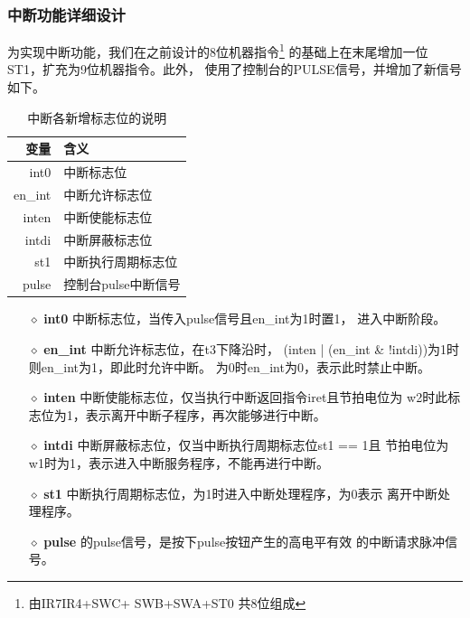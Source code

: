 \subsubsection{中断功能详细设计}
为实现中断功能，我们在之前设计的8位机器指令\footnote{ 由IR7\wave IR4+SWC+
    SWB+SWA+ST0 共8位组成} 的基础上在末尾增加一位ST1，扩充为9位机器指令。此外，
使用了控制台的PULSE信号，并增加了新信号如下。
\begin{table}[h]
    \centering
    \label{interrupt_signal}
    \begin{tabular}[c]{r | l }
        \hline
        变量      & 含义           \\
        \hline
        int0    & 中断标志位        \\
        en\_int & 中断允许标志位      \\ %
        inten   & 中断使能标志位      \\
        intdi   & 中断屏蔽标志位      \\
        st1     & 中断执行周期标志位    \\
        pulse   & 控制台pulse中断信号 \\
        \hline
    \end{tabular}
    \caption{中断各新增标志位的说明}
\end{table}
\begin{itemize}
    \item[$\diamond$ \textbf{int0}] 中断标志位，当传入pulse信号且en\_{}int为1时置1，
        进入中断阶段。
    \item[$\diamond$ \textbf{en\_int}] 中断允许标志位，在t3下降沿时，
        (inten | (en\_int \& !intdi))为1时则en\_int为1，即此时允许中断。
        为0时en\_int为0，表示此时禁止中断。
    \item[$\diamond$ \textbf{inten}] 中断使能标志位，仅当执行中断返回指令iret且节拍电位为
        w2时此标志位为1，表示离开中断子程序，\tec 再次能够进行中断。
    \item[$\diamond$ \textbf{intdi}] 中断屏蔽标志位，仅当中断执行周期标志位st1 == 1且
        节拍电位为w1时为1，表示进入中断服务程序，\tec 不能再进行中断。
    \item[$\diamond$ \textbf{st1}] 中断执行周期标志位，为1时进入中断处理程序，为0表示
        离开中断处理程序。
    \item[$\diamond$ \textbf{pulse}] \tec 的pulse信号，是按下pulse按钮产生的高电平有效
        的中断请求脉冲信号。
\end{itemize}
